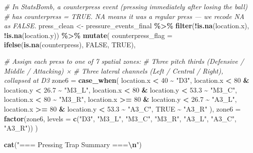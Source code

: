 \documentclass[
]{article}
\newenvironment{Shaded}{\begin{snugshade}}{\end{snugshade}}
\newcommand{\AttributeTok}[1]{\textcolor[rgb]{0.13,0.29,0.53}{#1}}
\newcommand{\CommentTok}[1]{\textcolor[rgb]{0.56,0.35,0.01}{\textit{#1}}}
\newcommand{\ConstantTok}[1]{\textcolor[rgb]{0.56,0.35,0.01}{#1}}
\newcommand{\DecValTok}[1]{\textcolor[rgb]{0.00,0.00,0.81}{#1}}
\newcommand{\FloatTok}[1]{\textcolor[rgb]{0.00,0.00,0.81}{#1}}
\newcommand{\FunctionTok}[1]{\textcolor[rgb]{0.13,0.29,0.53}{\textbf{#1}}}
\newcommand{\NormalTok}[1]{#1}
\newcommand{\OtherTok}[1]{\textcolor[rgb]{0.56,0.35,0.01}{#1}}
\newcommand{\SpecialCharTok}[1]{\textcolor[rgb]{0.81,0.36,0.00}{\textbf{#1}}}
\newcommand{\StringTok}[1]{\textcolor[rgb]{0.31,0.60,0.02}{#1}}
\begin{document}
\begin{Shaded}
\begin{Highlighting}[]
\CommentTok{\# In StatsBomb, a counterpress event (pressing immediately after losing the ball)}
\CommentTok{\# has counterpress = TRUE. NA means it was a regular press — we recode NA as FALSE.}
\NormalTok{press\_clean }\OtherTok{\textless{}{-}}\NormalTok{ pressure\_events\_final }\SpecialCharTok{\%\textgreater{}\%}
  \FunctionTok{filter}\NormalTok{(}\SpecialCharTok{!}\FunctionTok{is.na}\NormalTok{(location.x), }\SpecialCharTok{!}\FunctionTok{is.na}\NormalTok{(location.y)) }\SpecialCharTok{\%\textgreater{}\%}
  \FunctionTok{mutate}\NormalTok{(}
    \AttributeTok{counterpress\_flag =} \FunctionTok{ifelse}\NormalTok{(}\FunctionTok{is.na}\NormalTok{(counterpress), }\ConstantTok{FALSE}\NormalTok{, }\ConstantTok{TRUE}\NormalTok{),}

    \CommentTok{\# Assign each press to one of 7 spatial zones:}
    \CommentTok{\# Three pitch thirds (Defensive / Middle / Attacking) ×}
    \CommentTok{\# Three lateral channels (Left / Central / Right), collapsed at D3}
    \AttributeTok{zone6 =} \FunctionTok{case\_when}\NormalTok{(}
\NormalTok{      location.x }\SpecialCharTok{\textless{}}  \DecValTok{40}                             \SpecialCharTok{\textasciitilde{}} \StringTok{"D3"}\NormalTok{,}
\NormalTok{      location.x }\SpecialCharTok{\textless{}}  \DecValTok{80} \SpecialCharTok{\&}\NormalTok{ location.y }\SpecialCharTok{\textless{}}  \FloatTok{26.7}        \SpecialCharTok{\textasciitilde{}} \StringTok{"M3\_L"}\NormalTok{,}
\NormalTok{      location.x }\SpecialCharTok{\textless{}}  \DecValTok{80} \SpecialCharTok{\&}\NormalTok{ location.y }\SpecialCharTok{\textless{}}  \FloatTok{53.3}        \SpecialCharTok{\textasciitilde{}} \StringTok{"M3\_C"}\NormalTok{,}
\NormalTok{      location.x }\SpecialCharTok{\textless{}}  \DecValTok{80}                             \SpecialCharTok{\textasciitilde{}} \StringTok{"M3\_R"}\NormalTok{,}
\NormalTok{      location.x }\SpecialCharTok{\textgreater{}=} \DecValTok{80} \SpecialCharTok{\&}\NormalTok{ location.y }\SpecialCharTok{\textless{}}  \FloatTok{26.7}        \SpecialCharTok{\textasciitilde{}} \StringTok{"A3\_L"}\NormalTok{,}
\NormalTok{      location.x }\SpecialCharTok{\textgreater{}=} \DecValTok{80} \SpecialCharTok{\&}\NormalTok{ location.y }\SpecialCharTok{\textless{}}  \FloatTok{53.3}        \SpecialCharTok{\textasciitilde{}} \StringTok{"A3\_C"}\NormalTok{,}
      \ConstantTok{TRUE}                                         \SpecialCharTok{\textasciitilde{}} \StringTok{"A3\_R"}
\NormalTok{    ),}
    \AttributeTok{zone6 =} \FunctionTok{factor}\NormalTok{(zone6,}
                   \AttributeTok{levels =} \FunctionTok{c}\NormalTok{(}\StringTok{"D3"}\NormalTok{, }\StringTok{"M3\_L"}\NormalTok{, }\StringTok{"M3\_C"}\NormalTok{, }\StringTok{"M3\_R"}\NormalTok{,}
                              \StringTok{"A3\_L"}\NormalTok{, }\StringTok{"A3\_C"}\NormalTok{, }\StringTok{"A3\_R"}\NormalTok{))}
\NormalTok{  )}

\FunctionTok{cat}\NormalTok{(}\StringTok{"=== Pressing Trap Summary ===}\SpecialCharTok{\textbackslash{}n}\StringTok{"}\NormalTok{)}
\end{Highlighting}
\end{Shaded}
\end{document}
